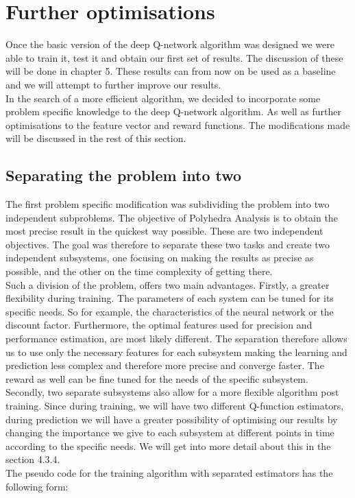 \section{Further optimisations}
Once the basic version of the deep Q-network algorithm was designed we were able to train it, test it and obtain our first set of results. The discussion of these will be done in chapter 5. These results can from now on be used as a baseline and we will attempt to further improve our results.\\
In the search of a more efficient algorithm, we decided to incorporate some problem specific knowledge to the deep Q-network algorithm. As well as further optimisations to the feature vector and reward functions. The modifications made will be discussed in the rest of this section.


\subsection{Separating the problem into two}
The first problem specific modification was subdividing the problem into two independent subproblems. The objective of Polyhedra Analysis is to obtain the most precise result in the quickest way possible. These are two independent objectives. The goal was therefore to separate these two tasks and create two independent subsystems, one focusing on making the results as precise as possible, and the other on the time complexity of getting there.\\
 Such a division of the problem, offers two main advantages. Firstly, a greater flexibility during training. The parameters of each system can be tuned for its specific needs. So for example, the characteristics of the neural network or the discount factor. Furthermore, the optimal features used for precision and performance estimation, are most likely different. The separation therefore allows us to use only the necessary features for each subsystem making the learning and prediction less complex and therefore more precise and converge faster. The reward as well can be fine tuned for the needs of the specific subsystem.\\ 
 Secondly, two separate subsystems also allow for a more flexible algorithm post training. Since during training, we will have  two different Q-function estimators, during prediction we will have a greater possibility of optimising our results by changing the importance we give to each subsystem at different points in time according to the specific needs. We will get into more detail about this in the section 4.3.4.\\
 The pseudo code for the training algorithm with separated estimators has the following form:


